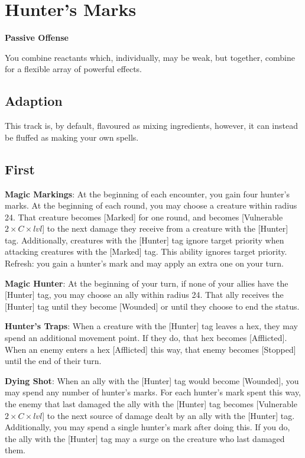 \section{Hunter’s Marks}
\textbf{Passive Offense}

You combine reactants which, individually, may be weak, but together, combine for a flexible array of powerful effects.

\subsection*{Adaption}
This track is, by default, flavoured as mixing ingredients, however, it can instead be fluffed as making your own spells.

\begin{multicols*}{2}
\subsection*{First \Facet\perk}
\textbf{Magic Markings}: At the beginning of each encounter, you gain four hunter's marks.  At the beginning of each round, you may choose a creature within radius 24. That creature becomes [Marked] for one round, and becomes [Vulnerable $2\times C\times lvl$] to the next damage they receive from a creature with the [Hunter] tag. Additionally, creatures with the [Hunter] tag ignore target priority when attacking creatures with the [Marked] tag. This ability ignores target priority. Refresh: you gain a hunter’s mark and may apply an extra one on your turn.

\textbf{Magic Hunter}: At the beginning of your turn, if none of your allies have the [Hunter] tag, you may choose an ally within radius 24. That ally receives the [Hunter] tag until they become [Wounded] or until they choose to end the status.

\textbf{Hunter’s Traps}: When a creature with the [Hunter] tag leaves a hex, they may spend an additional movement point. If they do, that hex becomes [Afflicted]. When an enemy enters a hex [Afflicted] this way, that enemy becomes [Stopped] until the end of their turn. 

\textbf{Dying Shot}: When an ally with the [Hunter] tag would become [Wounded], you may spend any number of hunter's marks. For each hunter's mark spent this way, the enemy that last damaged the ally with the [Hunter] tag becomes [Vulnerable $2\times C\times lvl$] to the next source of damage dealt by an ally with the [Hunter] tag. Additionally, you may spend a single hunter's mark after doing this. If you do, the ally with the [Hunter] tag may a surge on the creature who last damaged them.


\end{multicols*}
